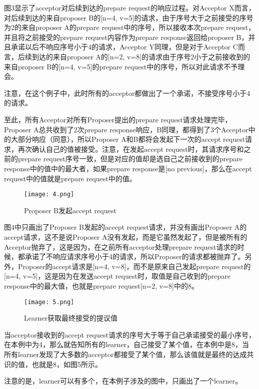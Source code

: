 \documentclass{article}
\begin{document}
图3显示了acceptor对后续到达的prepare request的响应过程。对Acceptor X而言，对后续到达的来自proposer B的[n=4, v=5]的请求，由于序号大于之前接受的序号为2的来自proposer A的prepare request中的序号，所以接收本次prepare request，并且将之前接受的prepare request内容作为prepare response返回给proposer B，并且承诺以后不响应序号小于4的请求，Acceptor Y同理，但是对于Acceptor C而言，后续到达的来自proposer A的[n=2, v=8]的请求由于序号2小于之前接收到的来自proposer B的[n=4, v=5]的prepare request中的序号，所以对此请求不予理会。

注意，在这个例子中，此时所有的acceptor都做出了一个承诺，不接受序号小于4的请求。

至此，所有Acceptor对所有Proposer提出的prepare request请求处理完毕，Proposer A总共收到了2次prepare response响应，B同理，都得到了3个Acceptor中的大部分响应（同意），所以Proposer A和B都将会发起下一次的accept request请求，再次确认自己的值被接受。注意，在发起accept request时，其请求序号和之前的prepare request序号一致，但是对应的值却是选自己之前接收到的prepare response中的值中的最大者，如果prepare response是[no previous]，那么在accept request中的值就是prepare request中的值。


\begin{figure}[h]
	\centering
	\texttt{[image: 4.png]}
	\caption{Proposer B发起accept request}
	\label{fig:label}
\end{figure}

图4中只画出了Proposer B发起的accept request请求，并没有画出Proposer A的accept请求，这不是说Proposer A没有发起，而是它虽然发起了，但是被所有的Acceptor抛弃了，这是因为，在之前所有acceptor处理prepare request请求的时候，都承诺了不响应请求序号小于4的请求，所以Proposer的请求都被抛弃了。另外，Proposer的accept请求是[n=4, v=8]，而不是原来自己发起prepare request的[n=4, v=5]，这是因为在发送accept request时，取值是自己收到的prepare response中的最大值，也就是prepare request[n=2, v=8]中的8。

\begin{figure}[h]
	\centering
	\texttt{[image: 5.png]}
	\caption{Learner获取最终接受的提议值}
	\label{fig:label}
\end{figure}

当acceptor接收到的accept request请求的序号大于等于自己承诺接受的最小序号，在本例中为4，那么就告知所有的learner，自己接受了某个值，在本例中是8，当所有learner发现了大多数的acceptor都接受了某个值，那么该值就是最终的达成共识的值，也就是8，如图5所示。

注意的是，learner可以有多个，在本例子涉及的图中，只画出了一个learner。
\end{document}
